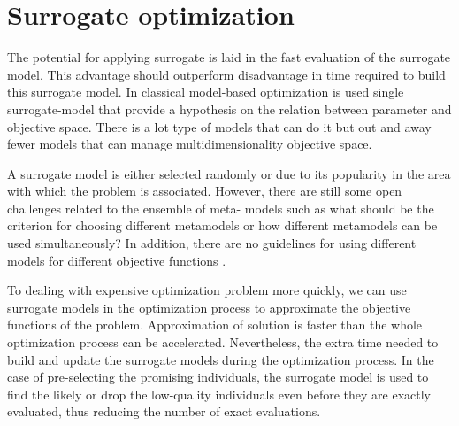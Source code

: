     \section{Surrogate optimization} 

        The potential for applying surrogate is laid in the fast evaluation of the surrogate model. This advantage should outperform disadvantage in time required to build this surrogate model. In classical model-based optimization is used single surrogate-model that provide a hypothesis on the relation between parameter and objective space. There is a lot type of models that can do it but out and away fewer models that can manage multidimensionality objective space.




        A surrogate model is either selected randomly or due to its popularity in the area with which the problem is associated.  However, there are still some open challenges related to the ensemble of meta- models such as what should be the criterion for choosing different metamodels or how different metamodels can be used simultaneously? In addition, there are no guidelines for using different models for different objective functions \cite{SoftSurvey}.

        \cite{EngSurMod} 

        To dealing with expensive optimization problem more quickly, we can use surrogate models in the optimization process to approximate the objective functions of the problem. Approximation of solution is faster than the whole optimization process can be accelerated. Nevertheless, the extra time needed to build and update the surrogate models during the optimization process. 
        In the case of pre-selecting the promising individuals, the surrogate model is used to find the likely or drop the low-quality individuals even before they are exactly evaluated, thus reducing the number of exact evaluations.

